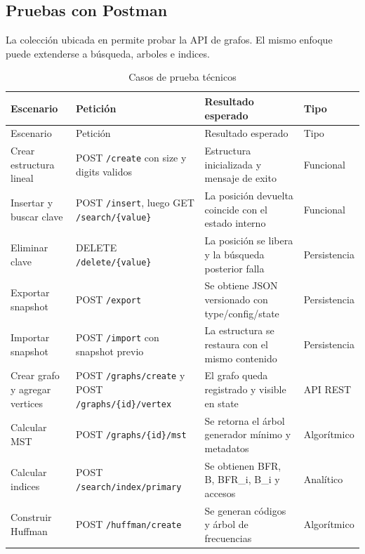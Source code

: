 \documentclass[12pt,onecolumn]{IEEEtran}
\begin{document}
\subsection{Pruebas con Postman}
La colección ubicada en  permite probar la API de grafos. El mismo enfoque puede extenderse a búsqueda, arboles e indices.

\begin{longtable}{>{\raggedright\arraybackslash}p{3.2cm}p{4.2cm}p{4.8cm}p{2.5cm}}
\caption{Casos de prueba técnicos}\label{tab:test-cases}\\
\toprule
Escenario & Petición & Resultado esperado & Tipo \\
\midrule
\endfirsthead
\toprule
Escenario & Petición & Resultado esperado & Tipo \\
\midrule
\endhead
Crear estructura lineal & POST \texttt{/create} con size y digits validos & Estructura inicializada y mensaje de exito & Funcional \\
Insertar y buscar clave & POST \texttt{/insert}, luego GET \texttt{/search/\{value\}} & La posición devuelta coincide con el estado interno & Funcional \\
Eliminar clave & DELETE \texttt{/delete/\{value\}} & La posición se libera y la búsqueda posterior falla & Persistencia \\
Exportar snapshot & POST \texttt{/export} & Se obtiene JSON versionado con type/config/state & Persistencia \\
Importar snapshot & POST \texttt{/import} con snapshot previo & La estructura se restaura con el mismo contenido & Persistencia \\
Crear grafo y agregar vertices & POST \texttt{/graphs/create} y POST \texttt{/graphs/\{id\}/vertex} & El grafo queda registrado y visible en state & API REST \\
Calcular MST & POST \texttt{/graphs/\{id\}/mst} & Se retorna el árbol generador mínimo y metadatos & Algorítmico \\
Calcular indices & POST \texttt{/search/index/primary} & Se obtienen BFR, B, BFR\_i, B\_i y accesos & Analítico \\
Construir Huffman & POST \texttt{/huffman/create} & Se generan códigos y árbol de frecuencias & Algorítmico \\
\bottomrule
\end{longtable}
\end{document}
